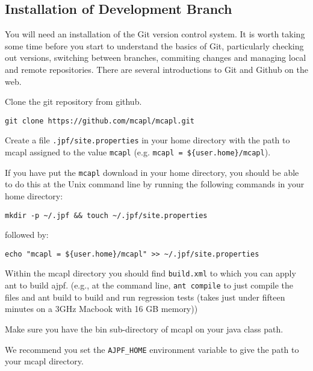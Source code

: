 \subsection{Installation of Development Branch}

You will need an installation of the Git version control system.  It is worth taking some time before you start to understand the basics of Git, particularly checking out versions, switching between branches, commiting changes and managing local and remote repositories.  There are several introductions to Git and Github on the web.

\begin{itemize}
\begin{sloppypar}
\item Clone the git repository from github. 
\begin{small}
\begin{verbatim}
git clone https://github.com/mcapl/mcapl.git
\end{verbatim}
\end{small}
\end{sloppypar}
\item Create a file \texttt{.jpf/site.properties} in your home directory with the path to mcapl assigned to the value \texttt{mcapl} (e.g. \texttt{mcapl = \$\{user.home\}/mcapl}).

If you have put the \texttt{mcapl} download in your home directory, you should be able to do this at the Unix command line by running the following commands in your home directory:

\begin{verbatim}
mkdir -p ~/.jpf && touch ~/.jpf/site.properties
\end{verbatim}
followed by:
\begin{verbatim}
echo "mcapl = ${user.home}/mcapl" >> ~/.jpf/site.properties
\end{verbatim}

\item Within the mcapl directory you should find \texttt{build.xml} to which you can apply ant to build ajpf. (e.g., at the command line, \lstinline{ant compile} to just compile the files and ant build to build and run regression tests (takes just under fifteen minutes on a 3GHz Macbook with 16 GB memory))
\item Make sure you have the bin sub-directory of mcapl on your java class path.
\item We recommend you set the \texttt{AJPF\_HOME} environment variable to give the path to your mcapl directory.
\end{itemize}

